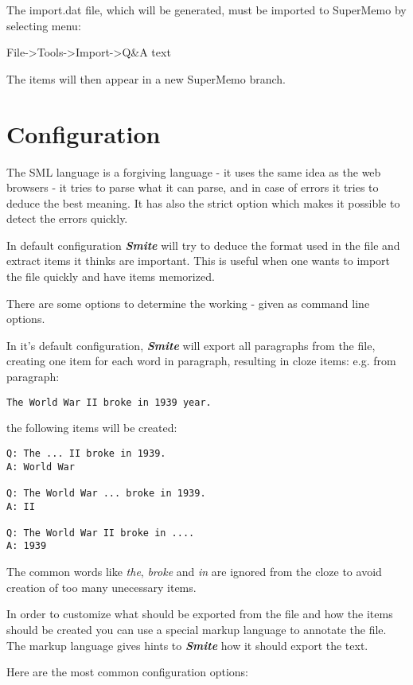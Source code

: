 \documentclass[a4paper,11pt]{article}
\newcommand{\smite}{\emph{\textbf{Smite{}}}}
\begin{document}
The import.dat file, which will be generated, must be imported to
SuperMemo by selecting menu:

File->Tools->Import->Q\&A text

The items will then appear in a new SuperMemo branch.

\section{Configuration}

The SML language is a forgiving language - it uses the same idea as the web
browsers - it tries to parse what it can parse, and in case of errors it tries
to deduce the best meaning. It has also the strict option which makes it
possible to detect the errors quickly.




In default configuration \smite{} will try to deduce the format used in the
file and extract items it thinks are important.  This is useful when one wants
to import the file quickly and have items memorized.

There are some options to determine the working - given as command line
options.



In it's default configuration, \smite{} will export all paragraphs from the
file, creating one item for each word in paragraph, resulting in cloze
items:
e.g. from paragraph:
\begin{verbatim}
The World War II broke in 1939 year.
\end{verbatim}
the following items will be created:

\begin{verbatim}
Q: The ... II broke in 1939.
A: World War

Q: The World War ... broke in 1939.
A: II

Q: The World War II broke in ....
A: 1939
\end{verbatim}

The common words like \textit{the}, \textit{broke} and \textit{in} are ignored
from the cloze to avoid creation of too many unecessary items.

In order to customize what should be exported from the file and how the
items should be created you can use a special markup language to annotate the
file.  The markup language gives hints to \smite{} how it should export the
text.


Here are the most common configuration options:
\end{document}
